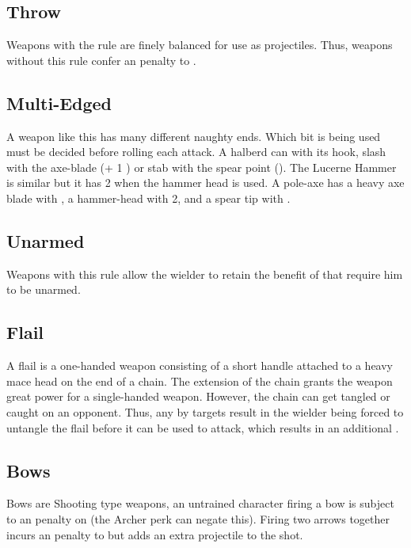 \subsection{Throw}
Weapons with the  rule are finely balanced for use as projectiles. Thus, weapons without this rule confer an  penalty to .

\subsection{Multi-Edged}
A weapon like this has many different naughty ends. Which bit is being used must be decided before rolling each attack. A halberd can  with its hook, slash with the axe-blade (+ 1 ) or stab with the spear point (). The Lucerne Hammer is similar but it has  2 when the hammer head is used. A pole-axe has a heavy axe blade with , a hammer-head with  2, and a spear tip with .

\subsection{Unarmed}
Weapons with this rule allow the wielder to retain the benefit of  that require him to be unarmed.

\subsection{Flail}
A flail is a one-handed weapon consisting of a short handle attached to a heavy mace head on the end of a chain. The extension of the chain grants the weapon great power for a single-handed weapon. However, the chain can get tangled or caught on an opponent. Thus, any   by targets result in the wielder being forced to untangle the flail before it can be used to attack, which results in an additional . 

\subsection{Bows}
Bows are Shooting type weapons, an untrained character firing a bow is subject to an  penalty on  (the Archer perk can negate this). Firing two arrows together incurs an  penalty to  but adds an extra projectile to the shot.

